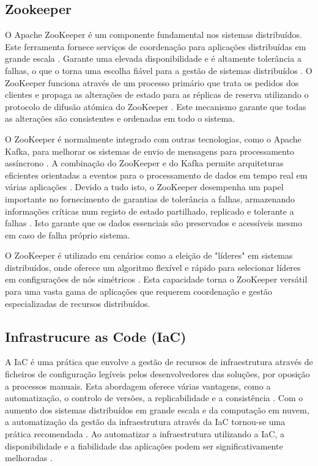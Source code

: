 \subsection{Zookeeper}
\label{sec:zookeeper}

O Apache ZooKeeper é um componente fundamental nos sistemas distribuídos. Este ferramenta
fornece serviços de coordenação para aplicações distribuídas em grande escala \cite{zookeeper2018}. 
Garante uma elevada disponibilidade e é altamente tolerância a falhas, o que o torna uma escolha 
fiável para a gestão de sistemas distribuídos \cite{zookeeper2021}. O ZooKeeper funciona através de 
um processo primário que trata os pedidos dos clientes e propaga as alterações de estado para as 
réplicas de reserva utilizando o protocolo de difusão atómica do ZooKeeper \cite{zookeeper2011}. 
Este mecanismo garante que todas as alterações são consistentes e ordenadas em todo o sistema.

O ZooKeeper é normalmente integrado com outras tecnologias, como o Apache Kafka, para melhorar os 
sistemas de envio de mensagens para processamento assíncrono \cite{zookeeper2024}. A combinação do 
ZooKeeper e do Kafka permite arquiteturas eficientes orientadas a eventos para o processamento de 
dados em tempo real em várias aplicações \cite{zookeeper2021b}. Devido a tudo isto, o ZooKeeper 
desempenha um papel importante no fornecimento de garantias de tolerância a falhas, armazenando 
informações críticas num registo de estado partilhado, replicado e tolerante a falhas
\cite{zookeeper2017}. Isto garante que os dados essenciais são preservados e acessíveis mesmo
em caso de falha próprio sistema.

O ZooKeeper é utilizado em cenários como a eleição de "líderes" em sistemas distribuídos, onde 
oferece um algoritmo flexível e rápido para selecionar líderes em configurações de nós simétricos 
\cite{zookeeper2021c}. Esta capacidade torna o ZooKeeper versátil para uma vasta gama de aplicações 
que requerem coordenação e gestão especializadas de recursos distribuídos.

\subsection{Infrastrucure as Code (IaC)}
\label{sec:iac}

A \ac{IaC} é uma prática que envolve a gestão de recursos de infraestrutura através de ficheiros 
de configuração legíveis pelos desenvolvedores das soluções, por oposição a processos manuais. Esta 
abordagem oferece várias vantagens, como a automatização, o controlo de versões, a replicabilidade 
e a consistência \cite{iac2023}. Com o aumento dos sistemas distribuídos em grande escala 
e da computação em nuvem, a automatização da gestão da infraestrutura através da \ac{IaC} 
tornou-se uma prática recomendada \cite{iac2016}. Ao automatizar a infraestrutura utilizando a 
\ac{IaC}, a disponibilidade e a fiabilidade das aplicações podem ser significativamente melhoradas 
\cite{iac2022}.

